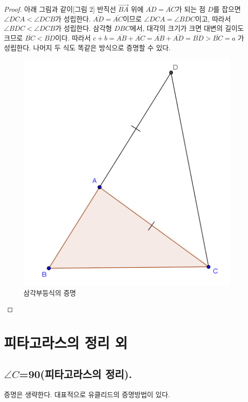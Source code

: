 \documentclass{article}
\newcommand{\C}{\ensuremath{\angle C}}
\newcommand{\D}{\ensuremath{{}^\circ}}
\newcommand{\PP}{\ensuremath{a^2+b^2=c^2}}
\begin{document}
\begin{proof}
아래 그림과 같이[그림 2] 반직선 \(\overrightarrow{BA}\) 위에 \(\overline{AD}=\overline{AC}\)가 되는 점 \(D\)를 잡으면 \(\angle DCA<\angle DCB\)가 성립한다.
\(\overline{AD}=\overline{AC}\)이므로 \(\angle DCA=\angle BDC\)이고, 따라서 \(\angle BDC<\angle DCB\)가 성립한다.
삼각형 \(DBC\)에서, 대각의 크기가 크면 대변의 길이도 크므로 \(\overline{BC}<\overline{BD}\)이다.
따라서
\(
c+b
=
\overline{AB}+\overline{AC}
=\overline{AB}+\overline{AD}
=\overline{BD}
>\overline{BC}
=a
\)
가 성립한다.
나머지 두 식도 똑같은 방식으로 증명할 수 있다.
\begin{figure}[h]
\center
\includegraphics{2}
\caption{삼각부등식의 증명}
\end{figure}
\end{proof}

\section{피타고라스의 정리 외}

\subsection{\C=90 (피타고라스의 정리).}
증명은 생략한다.
대표적으로 유클리드의 증명방법이 있다.
\end{document}
